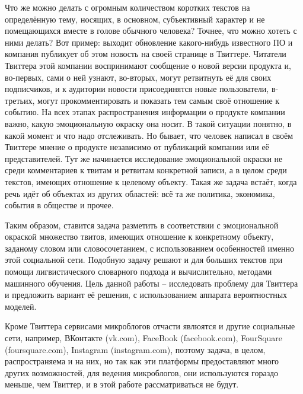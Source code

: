 Что же можно делать с огромным количеством коротких текстов на определённую
тему, носящих, в основном, субъективный характер и не помещающихся вместе
в голове обычного человека? Точнее, что можно хотеть с ними делать? Вот пример:
выходит обновление какого-нибудь известного ПО и компания публикует об этом
новость на своей странице в Твиттере. Читатели Твиттера этой компании воспринимают
сообщение о новой версии продукта и, во-первых, сами о ней узнают, во-вторых,
могут ретвитнуть её для своих подписчиков, и к аудитории новости присоединятся новые пользователи,
в-третьих, могут прокомментировать и показать тем самым своё отношение к событию.
На всех этапах распространения информации о продукте компании важно, какую
эмоциональную окраску она носит. В такой ситуации понятно, в какой момент и что
надо отслеживать. Но бывает, что человек написал в своём Твиттере мнение о
продукте независимо от публикаций компании или её представителей. Тут же
начинается исследование эмоциональной окраски не среди комментариев к твитам и
ретвитам конкретной записи, а в целом среди текстов, имеющих отношение к целевому
объекту. Такая же задача встаёт, когда речь идёт об объектах из других областей:
всё та же политика, экономика, события в обществе и прочее.

Таким образом, ставится задача разметить в соответствии с эмоциональной окраской
множество твитов, имеющих отношение к конкретному объекту, заданому словом или
словосочетанием, с использованием особенностей именно этой социальной сети. Подобную
задачу решают и для больших текстов при помощи лигвистического словарного подхода и
вычислительно, методами машинного обучения. Цель данной работы --
исследовать проблему для Твиттера и предложить вариант её решения, с использованием
аппарата вероятностных моделей.

Кроме Твиттера сервисами микроблогов отчасти явлюятся и другие социальные сети, например,
ВКонтакте (vk.com), FaceBook (facebook.com), FourSquare (foursquare.com),
Instagram (instagram.com), поэтому задача, в целом, распространяема и на них,
но так как эти платформы предоставляют много других возможностей, для ведения
микроблогов, они используются гораздо меньше, чем Твиттер, и в этой работе
рассматриваться не будут.
